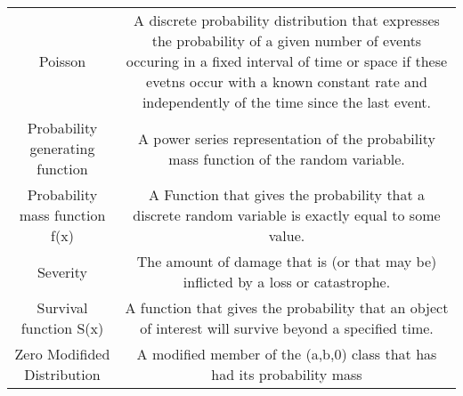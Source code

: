 \documentclass[]{book}
\theoremstyle{definition}
\theoremstyle{definition}
\theoremstyle{definition}
\theoremstyle{remark}
\begin{document}
\begin{longtable}[]{@{}cc@{}}
\begin{minipage}[t]{0.43\columnwidth}
Poisson\strut
\end{minipage} & \begin{minipage}[t]{0.43\columnwidth}\centering\strut
A discrete probability distribution that expresses the probability of a
given number of events occuring in a fixed interval of time or space if
these evetns occur with a known constant rate and independently of the
time since the last event.\strut
\end{minipage}\tabularnewline
\begin{minipage}[t]{0.43\columnwidth}\centering\strut
Probability generating function\strut
\end{minipage} & \begin{minipage}[t]{0.43\columnwidth}\centering\strut
A power series representation of the probability mass function of the
random variable.\strut
\end{minipage}\tabularnewline
\begin{minipage}[t]{0.43\columnwidth}\centering\strut
Probability mass function f(x)\strut
\end{minipage} & \begin{minipage}[t]{0.43\columnwidth}\centering\strut
A Function that gives the probability that a discrete random variable is
exactly equal to some value.\strut
\end{minipage}\tabularnewline
\begin{minipage}[t]{0.43\columnwidth}\centering\strut
Severity\strut
\end{minipage} & \begin{minipage}[t]{0.43\columnwidth}\centering\strut
The amount of damage that is (or that may be) inflicted by a loss or
catastrophe.\strut
\end{minipage}\tabularnewline
\begin{minipage}[t]{0.43\columnwidth}\centering\strut
Survival function S(x)\strut
\end{minipage} & \begin{minipage}[t]{0.43\columnwidth}\centering\strut
A function that gives the probability that an object of interest will
survive beyond a specified time.\strut
\end{minipage}\tabularnewline
\begin{minipage}[t]{0.43\columnwidth}\centering\strut
Zero Modifided Distribution\strut
\end{minipage} & \begin{minipage}[t]{0.43\columnwidth}\centering\strut
A modified member of the (a,b,0) class that has had its probability mass

\end{minipage}
\end{longtable}
\end{document}

